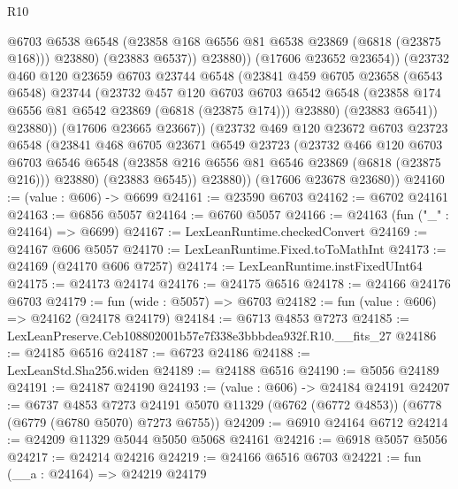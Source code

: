 \begin{lexlean}{R10}
\begin{coremodule}
                      @6703
                      @6538
                      @6548
                      (@23858 @168 @6556 @81 @6538 @23869 (@6818 (@23875 @168)))
                      @23880)
                    (@23883 @6537))
                  @23880))
              (@17606 @23652 @23654))
            (@23732
              @460
              @120
              @23659
              @6703
              @23744
              @6548
              (@23841
                @459
                @6705
                @23658
                (@6543 @6548)
                @23744
                (@23732
                  @457
                  @120
                  @6703
                  @6703
                  @6542
                  @6548
                  (@23858 @174 @6556 @81 @6542 @23869 (@6818 (@23875 @174)))
                  @23880)
                (@23883 @6541))
              @23880))
          (@17606 @23665 @23667))
        (@23732
          @469
          @120
          @23672
          @6703
          @23723
          @6548
          (@23841
            @468
            @6705
            @23671
            @6549
            @23723
            (@23732
              @466
              @120
              @6703
              @6703
              @6546
              @6548
              (@23858 @216 @6556 @81 @6546 @23869 (@6818 (@23875 @216)))
              @23880)
            (@23883 @6545))
          @23880))
      (@17606 @23678 @23680))
@24160 := (value : @606) -> @6699
@24161 := @23590 @6703
@24162 := @6702 @24161
@24163 := @6856 @5057
@24164 := @6760 @5057
@24166 := @24163 (fun ("_" : @24164) => @6699)
@24167 := LexLeanRuntime.checkedConvert
@24169 := @24167 @606 @5057
@24170 := LexLeanRuntime.Fixed.toToMathInt
@24173 := @24169 (@24170 @606 @7257)
@24174 := LexLeanRuntime.instFixedUInt64
@24175 := @24173 @24174
@24176 := @24175 @6516
@24178 := @24166 @24176 @6703
@24179 := fun (wide : @5057) => @6703
@24182 := fun (value : @606) => @24162 (@24178 @24179)
@24184 := @6713 @4853 @7273
@24185 := LexLeanPreserve.Ceb108802001b57e7f338e3bbbdea932f.R10.__fits_27
@24186 := @24185 @6516
@24187 := @6723 @24186
@24188 := LexLeanStd.Sha256.widen
@24189 := @24188 @6516
@24190 := @5056 @24189
@24191 := @24187 @24190
@24193 := (value : @606) -> @24184 @24191
@24207 := @6737
    @4853
    @7273
    @24191
    @5070
    @11329
    (@6762 (@6772 @4853))
    (@6778 (@6779 (@6780 @5070) @7273 @6755))
@24209 := @6910 @24164 @6712
@24214 := @24209 @11329 @5044 @5050 @5068 @24161
@24216 := @6918 @5057 @5056
@24217 := @24214 @24216
@24219 := @24166 @6516 @6703
@24221 := fun (__a : @24164) => @24219 @24179

\end{coremodule}
\end{lexlean}
